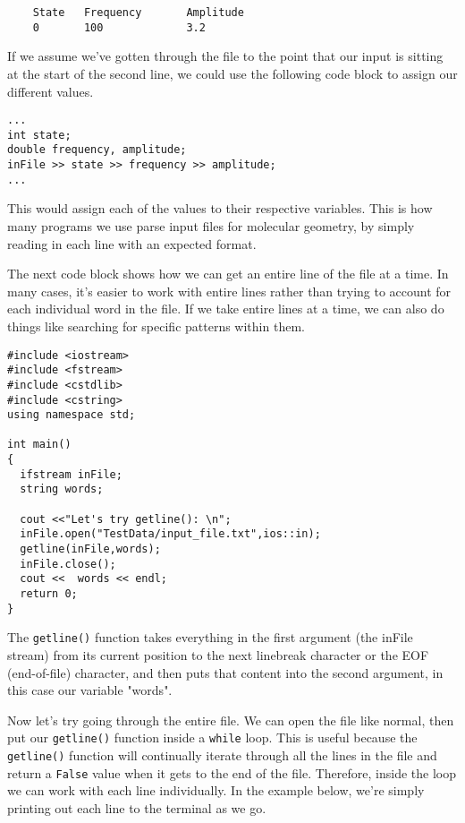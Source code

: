 \begin{verbatim}
    State   Frequency       Amplitude
    0       100             3.2
\end{verbatim}

If we assume we've gotten through the file to the point that our input is sitting at the start of the second line, we could use the following code block to assign our different values.

\begin{verbatim}
...
int state;
double frequency, amplitude;
inFile >> state >> frequency >> amplitude;
...
\end{verbatim}

This would assign each of the values to their respective variables.  This is how many programs we use parse input files for molecular geometry, by simply reading in each line with an expected format.

The next code block shows how we can get an entire line of the file at a time.  In many cases, it's easier to work with entire lines rather than trying to account for each individual word in the file.  If we take entire lines at a time, we can also do things like searching for specific patterns within them.

\begin{verbatim}
#include <iostream>
#include <fstream>
#include <cstdlib>
#include <cstring>
using namespace std;

int main()
{
  ifstream inFile;
  string words;
 
  cout <<"Let's try getline(): \n";
  inFile.open("TestData/input_file.txt",ios::in);
  getline(inFile,words);
  inFile.close();
  cout <<  words << endl;
  return 0;
}
\end{verbatim}

The \texttt{getline()} function takes everything in the first argument (the inFile stream) from its current position to the next linebreak character or the EOF (end-of-file) character, and then puts that content into the second argument, in this case our variable "words".

Now let's try going through the entire file.  We can open the file like normal, then put our \texttt{getline()} function inside a \texttt{while} loop.  This is useful because the \texttt{getline()} function will continually iterate through all the lines in the file and return a \texttt{False} value when it gets to the end of the file.  Therefore, inside the loop we can work with each line individually.  In the example below, we're simply printing out each line to the terminal as we go.

